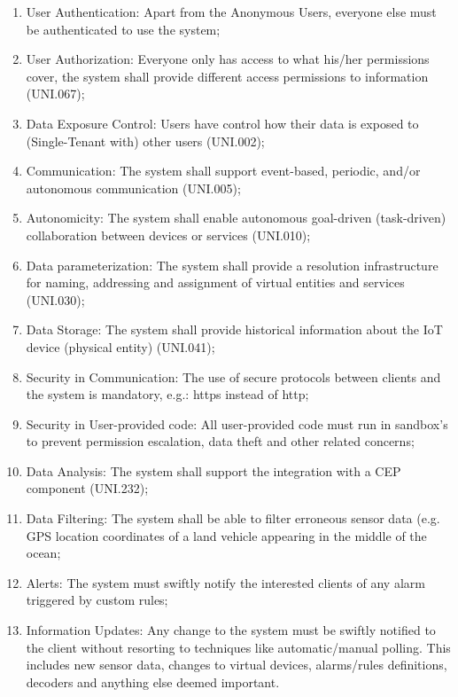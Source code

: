 \begin{enumerate}
    \item User Authentication: Apart from the Anonymous Users, everyone else must be authenticated to use the system;
    \item User Authorization: Everyone only has access to what his/her permissions cover, the system shall provide different access permissions to information (UNI.067);
    \item Data Exposure Control: Users have control how their data is exposed to (Single-Tenant with) other users (UNI.002);
    \item Communication: The system shall support event-based, periodic, and/or autonomous communication (UNI.005);
    \item Autonomicity: The system shall enable autonomous goal-driven (task-driven) collaboration between devices or services (UNI.010);
    \item Data parameterization: The system shall provide a resolution infrastructure for naming, addressing and assignment of virtual entities and services (UNI.030);
    \item Data Storage: The system shall provide historical information about the \gls{IoT} device (physical entity) (UNI.041);
    \item Security in Communication: The use of secure protocols between clients and the system is mandatory, e.g.: https instead of http;
    \item Security in User-provided code: All user-provided code must run in sandbox's to prevent permission escalation, data theft and other related concerns;
    \item Data Analysis: The system shall support the integration with a \gls{CEP} component (UNI.232);
    \item Data Filtering: The system shall be able to filter erroneous sensor data (e.g. GPS location coordinates of a land vehicle appearing in the middle of the ocean;
    \item Alerts: The system must swiftly notify the interested clients of any alarm triggered by custom rules;
    \item Information Updates: Any change to the system must be swiftly notified to the client without resorting to techniques like automatic/manual polling. This includes new sensor data, changes to virtual devices, alarms/rules definitions, decoders and anything else deemed important.
\end{enumerate}

